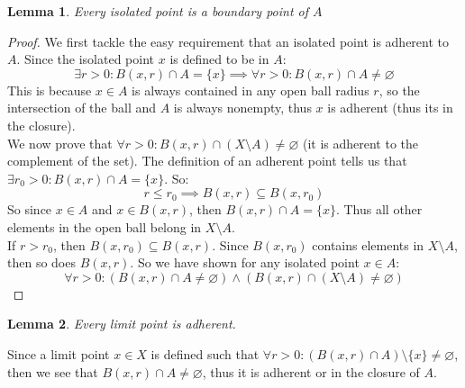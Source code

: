 \documentclass{article}
\newtheorem{lem}{Lemma}[section]
\begin{document}
\medskip
\begin{lem}
Every isolated point is a boundary point of $A$
\end{lem}
\begin{proof}
We first tackle the easy requirement that an isolated point is adherent to $A$. Since the isolated point $x$ is defined to be in $A$:
\begin{equation*}
    \exists r > 0: B(x, r) \cap A = \{x\} \implies \forall r > 0: B(x, r) \cap A \neq \varnothing
\end{equation*}
This is because $x \in A$ is always contained in any open ball radius $r$, so the intersection of the ball and $A$ is always nonempty, thus $x$ is adherent (thus its in the closure).\\

We now prove that $\forall r > 0: B(x, r) \cap (X \setminus A) \neq \varnothing$ (it is adherent to the complement of the set). The definition of an adherent point tells us that $\exists r_0 > 0: B(x, r) \cap A = \{x\}$. So:
\begin{equation*}
    r \leqslant r_0 \implies B(x, r) \subseteq B(x, r_0)
\end{equation*}
So since $x \in A$ and $x \in B(x, r)$, then $B(x, r) \cap A = \{x\}$. Thus all other elements in the open ball belong in $X \setminus A$.\\

If $r > r_0$, then $B(x, r_0) \subseteq B(x, r)$. Since $B(x, r_0)$ contains elements in $X \setminus A$, then so does $B(x, r)$. So we have shown for any isolated point $x \in A$:
\begin{equation*}
    \forall r > 0: (B(x, r) \cap A \neq \varnothing) \land (B(x, r) \cap (X \setminus A) \neq \varnothing)
\end{equation*}
\end{proof}

\medskip
\begin{lem}
Every limit point is adherent.
\end{lem}
Since a limit point $x \in X$ is defined such that $\forall r > 0: (B(x, r) \cap A) \setminus \{x\} \neq \varnothing$, then we see that $B(x, r) \cap A \neq \varnothing$, thus it is adherent or in the closure of $A$.
\end{document}
